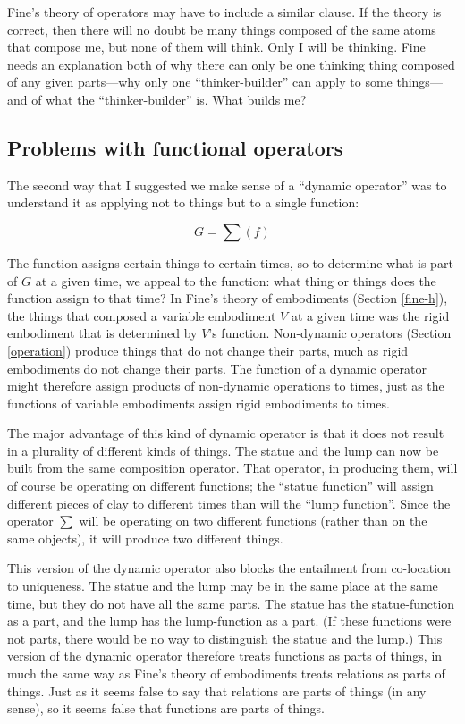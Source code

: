 \documentclass[12pt,twoside]{reedfancy}
\begin{document}
\begin{spacing}{1.25}
Fine's theory of operators may have to include a similar clause.  If
the theory is correct, then there will no doubt be many things
composed of the same atoms that compose me, but none of them will
think.  Only I will be thinking.  Fine needs an explanation both of
why there can only be one thinking thing composed of any given
parts---why only one ``thinker-builder'' can apply to some
things---and of what the ``thinker-builder'' is.  What builds me?

\subsection{Problems with functional operators}
\label{problems2b}
The second way that I suggested we make sense of a ``dynamic
operator'' was to understand it as applying not to things but to a
single function:

\begin{displaymath}
G = \sum ( f )
\end{displaymath}

The function assigns certain things to certain times, so to determine
what is part of $G$ at a given time, we appeal to the function: what
thing or things does the function assign to that time?  In Fine's
theory of embodiments (Section \ref{fine-h}), the things that composed
a variable embodiment $V$ at a given time was the rigid embodiment
that is determined by $V$'s function.  Non-dynamic operators (Section
\ref{operation}) produce things that do not change their parts, much
as rigid embodiments do not change their parts.  The function of a
dynamic operator might therefore assign products of non-dynamic
operations to times, just as the functions of variable embodiments
assign rigid embodiments to times.

The major advantage of this kind of dynamic operator is that it does
not result in a plurality of different kinds of things.  The statue
and the lump can now be built from the same composition operator.
That operator, in producing them, will of course be operating on
different functions; the ``statue function'' will assign different
pieces of clay to different times than will the ``lump function''.
Since the operator $\sum$ will be operating on two different functions
(rather than on the same objects), it will produce two different
things.

This version of the dynamic operator also blocks the entailment from
co-location to uniqueness.  The statue and the lump may be in the same
place at the same time, but they do not have all the same parts.  The
statue has the statue-function as a part, and the lump has the
lump-function as a part.  (If these functions were not parts, there
would be no way to distinguish the statue and the lump.)  This version
of the dynamic operator therefore treats functions as parts of things,
in much the same way as Fine's theory of embodiments treats relations
as parts of things.  Just as it seems false to say that relations are
parts of things (in any sense), so it seems false that functions are
parts of things.


\end{spacing}
\end{document}
